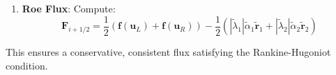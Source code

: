 \documentclass[12pt]{article}
\begin{document}
\begin{enumerate}
    \item \textbf{Roe Flux}: Compute:
    \[
    \mathbf{F}_{i+1/2} = \frac{1}{2} \left( \mathbf{f}(\mathbf{u}_L) + \mathbf{f}(\mathbf{u}_R) \right) - \frac{1}{2} \left( |\tilde{\lambda}_1| \tilde{\alpha}_1 \tilde{\mathbf{r}}_1 + |\tilde{\lambda}_2| \tilde{\alpha}_2 \tilde{\mathbf{r}}_2 \right)
    \]
\end{enumerate}

This ensures a conservative, consistent flux satisfying the Rankine-Hugoniot condition.
\end{document}

